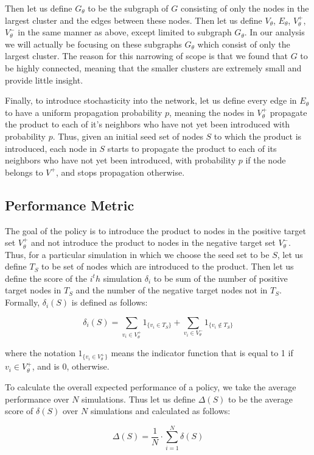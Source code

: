 Then let us define $G_\theta$ to be the subgraph of $G$ consisting of only the nodes in the largest cluster and the edges between these nodes. Then let us define $V_\theta$, $E_\theta$, $V_\theta^+$, $V_\theta^-$ in the same manner as above, except limited to subgraph $G_\theta$. In our analysis we will actually be focusing on these subgraphs $G_\theta$ which consist of only the largest cluster. The reason for this narrowing of scope is that we found that $G$ to be highly connected, meaning that the smaller clusters are extremely small and provide little insight. 

Finally, to introduce stochasticity into the network, let us define every edge in $E_\theta$ to have a uniform propagation probability $p$, meaning the nodes in $V_\theta^+$ propagate the product to each of it's neighbors who have not yet been introduced with probability $p$. Thus, given an initial seed set of nodes $S$ to which the product is introduced, each node in $S$ starts to propagate the product to each of its neighbors who have not yet been introduced, with probability $p$ if the node belongs to $V^+$, and stops propagation otherwise. 

\subsection{ Performance Metric }

The goal of the policy is to introduce the product to nodes in the positive target set $V_\theta^+$ and not introduce the product to nodes in the negative target set $V_\theta^-$. Thus, for a particular simulation in which we choose the seed set to be $S$, let us define $T_S$ to be set of nodes which are introduced to the product. Then let us define the score of the $i^th$ simulation $\delta_i$ to be sum of the number of  positive target nodes in $T_S$ and the number of the negative target nodes not in $T_S$. Formally, $\delta_i(S)$ is defined as follows:

\begin{equation}
	\delta_i(S) = \sum_{v_i \in V_\theta^+} 1_{\{v_i \in T_S\}} + \sum_{v_i \in V_\theta^-} 1_{\{v_i \not \in T_S\}}
\end{equation}

where the notation $1_{\{v_i \in V_\theta^+\}}$ means the indicator function that is equal to 1 if $v_i \in V_\theta^+$, and is 0, otherwise.

To calculate the overall expected performance of a policy, we take the average performance over $N$ simulations. Thus let us define $\Delta(S)$ to be the average score of $\delta(S)$ over $N$ simulations and calculated as follows:

\begin{equation}
	\Delta(S) = \frac{1}{N} \cdot \sum_{i = 1}^{N} \delta(S)
\end{equation}

